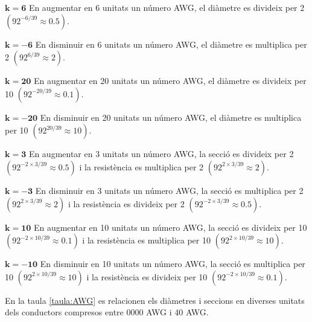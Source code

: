 \begin{list}{}
   {\setlength{\labelwidth}{15mm} \setlength{\leftmargin}{17mm} \setlength{\labelsep}{2mm}}

   \item[$\boldsymbol{k=6}$\hfill] En augmentar en 6  unitats un número AWG, el diàmetre es divideix per 2
                 $(92^{-6/39}\approx \num{0,5})$.

   \item[$\boldsymbol{k=-6}$\hfill] En disminuir en 6 unitats un número AWG, el diàmetre es multiplica per 2
                 $(92^{6/39}\approx 2)$.

   \item[$\boldsymbol{k=20}$\hfill] En augmentar en 20  unitats un número AWG, el diàmetre es divideix per 10
                 $(92^{-20/39}\approx \num{0,1})$.

   \item[$\boldsymbol{k=-20}$\hfill] En disminuir en 20 unitats un número AWG, el diàmetre es multiplica per 10
                 $(92^{20/39}\approx 10)$.

   \item[$\boldsymbol{k=3}$\hfill] En augmentar en 3 unitats un número AWG, la secció es divideix per 2
                 $(92^{-2\times 3/39}\approx \num{0,5})$ i la resistència es multiplica per 2
                 $(92^{2\times 3/39}\approx 2)$.

   \item[$\boldsymbol{k=-3}$\hfill] En disminuir en 3 unitats un número AWG, la secció es multiplica per 2
                  $(92^{2\times 3/39}\approx 2)$ i la resistència es divideix per 2
                  $(92^{-2\times 3/39}\approx \num{0,5})$.

   \item[$\boldsymbol{k=10}$\hfill] En augmentar en 10 unitats un número AWG, la secció es divideix per 10
                 $(92^{-2\times 10/39}\approx \num{0,1})$ i la resistència es multiplica per 10
                 $(92^{2\times 10/39}\approx 10)$.

   \item[$\boldsymbol{k=-10}$\hfill] En disminuir en 10 unitats un número AWG, la secció es multiplica per 10
                  $(92^{2\times 10/39}\approx 10)$ i la resistència es divideix per 10
                  $(92^{-2\times 10/39}\approx \num{0,1})$.
\end{list}

En la taula \vref{taula:AWG} es relacionen els diàmetres i seccions en diverses unitats dels conductors compresos entre 0000 AWG i 40 AWG.

